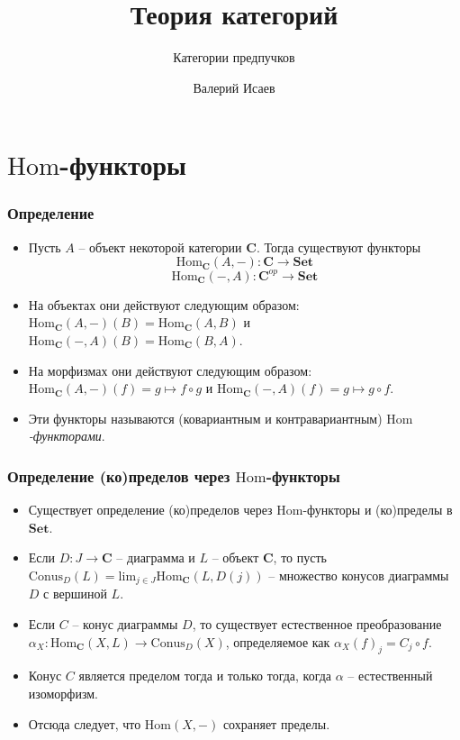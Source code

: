 \documentclass{beamer}
\theoremstyle{definition}
\newcommand{\cat}[1]{\mathbf{#1}}
\renewcommand{\C}{\cat{C}}
\newcommand{\Set}{\cat{Set}}
\newcommand{\Conus}{\mathrm{Conus}}
\newcommand{\Hom}{\mathrm{Hom}}
\newcommand{\limit}{\mathrm{lim}}
\begin{document}
\title{Теория категорий}
\subtitle{Категории предпучков}
\author{Валерий Исаев}
\maketitle

\section{$\Hom$-функторы}

\begin{frame}
\frametitle{Определение}
\begin{itemize}
\item Пусть $A$ -- объект некоторой категории $\C$. Тогда существуют функторы
\[ \Hom_\C(A, -) : \C \to \Set \]
\[ \Hom_\C(-, A) : \C^{op} \to \Set \]
\item На объектах они действуют следующим образом: $\Hom_\C(A, -)(B) = \Hom_\C(A, B)$ и $\Hom_\C(-, A)(B) = \Hom_\C(B, A)$.
\item На морфизмах они действуют следующим образом: $\Hom_\C(A, -)(f) = g \mapsto f \circ g$ и $\Hom_\C(-, A)(f) = g \mapsto g \circ f$.
\item Эти функторы называются (ковариантным и контравариантным) \emph{$\Hom$-функторами}.
\end{itemize}
\end{frame}

\begin{frame}
\frametitle{Определение (ко)пределов через $\Hom$-функторы}
\begin{itemize}
\item Существует определение (ко)пределов через $\Hom$-функторы и (ко)пределы в $\Set$.
\item Если $D : J \to \C$ -- диаграмма и $L$ -- объект $\C$, то пусть $\Conus_D(L) = \limit_{j \in J} \Hom_\C(L, D(j))$ -- множество конусов диаграммы $D$ с вершиной $L$.
\item Если $C$ -- конус диаграммы $D$, то существует естественное преобразование $\alpha_X : \Hom_\C(X,L) \to \Conus_D(X)$, определяемое как $\alpha_X(f)_j = C_j \circ f$.
\item Конус $C$ является пределом тогда и только тогда, когда $\alpha$ -- естественный изоморфизм.
\item Отсюда следует, что $\Hom(X,-)$ сохраняет пределы.
\end{itemize}
\end{frame}
\end{document}
